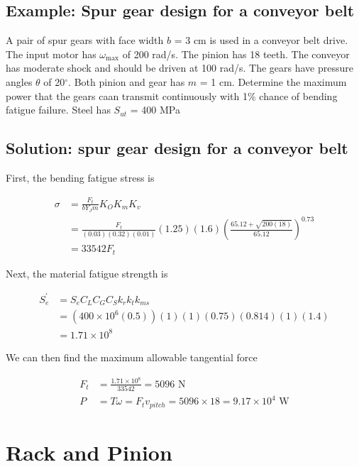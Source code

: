 \documentclass[a4paper,openany]{tufte-book}
\begin{document}
\subsection{Example: Spur gear design for a conveyor belt}
\label{sec:org8a78c45}

A pair of spur gears with face width \(b\) = 3 cm is used in a conveyor belt drive. The input motor has \(\omega_{\max}\) of 200 rad/s. The pinion has 18 teeth. The conveyor has moderate shock and should be driven at 100 rad/s. The gears have pressure angles \(\theta\) of 20\(^{\circ}\). Both pinion and gear has \(m\) = 1 cm. Determine the maximum power that the gears caan transmit continuously with 1\% chance of bending fatigue failure. Steel has \(S_{ut}\) = 400 MPa

\subsection{Solution: spur gear design for a conveyor belt}
\label{sec:orgc7b4eb9}

First, the bending fatigue stress is

\begin{align*}
  \sigma &= \frac{F_{t}}{bY_{J}m} K_{O}K_{m}K_{v} \\
         &= \frac{F_{t}}{(0.03)(0.32)(0.01)} (1.25)(1.6) \left( \frac{65.12 + \sqrt{200(18)}}{65.12} \right)^{0.73} \\
         &= 33542 F_{t}
\end{align*}

Next, the material fatigue strength is

\begin{align*}
  S_{e}^{\prime} &= S_{e}C_{L}C_{G}C_{S}k_{r}k_{t}k_{ms} \\
                 &= (400 \times 10^{6}(0.5))(1)(1)(0.75)(0.814)(1)(1.4) \\
                 &= 1.71 \times 10^{8}
  \end{align*}

We can then find the maximum allowable tangential force

\begin{align*}
  F_{t} &= \frac{1.71 \times 10^{8}}{33542} = 5096 \text{ N} \\
  P &= T \omega = F_{t} v_{pitch} = 5096 \times 18 = 9.17 \times 10^{4} \text{ W}
\end{align*}

\section{Rack and Pinion}
\label{sec:org6170aef}
\end{document}
